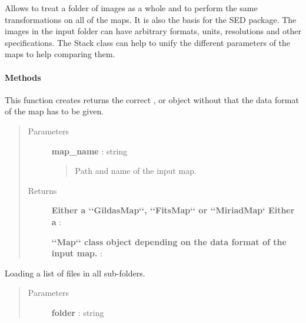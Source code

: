 \documentclass[a4paper,10pt,english]{sphinxmanual}
\begin{document}
\begin{fulllineitems}
\label{maps:astrolyze.maps.stack.Stack}
Allows to treat a folder of images as a whole and to perform the same
transformations on all of the maps. It is also the basis for the SED
package. The images in the input folder can have arbitrary formats, units,
resolutions and other specifications.
The Stack class can help to unify the different parameters of the maps to
help comparing them.
\paragraph{Methods}

\begin{fulllineitems}
\label{maps:astrolyze.maps.stack.Stack.get_map_format}
This function creates returns the correct ,
 or  object without that the data format of the
map has to be given.
\begin{quote}\begin{description}
\item[{Parameters }] \leavevmode
\textbf{map\_name} : string
\begin{quote}

Path and name of the input map.
\end{quote}

\item[{Returns }] \leavevmode
\textbf{Either a {}`{}`GildasMap{}`{}`, {}`{}`FitsMap{}`{}` or {}`{}`MiriadMap{}` Either a} :

\textbf{{}`{}`Map{}`{}` class object depending on the data format of the input map.} :

\end{description}\end{quote}

\end{fulllineitems}


\begin{fulllineitems}
\label{maps:astrolyze.maps.stack.Stack.get_list}
Loading a list of files in all sub-folders.
\begin{quote}\begin{description}
\item[{Parameters }] \leavevmode
\textbf{folder} : string
\begin{quote}


\end{quote}
\end{description}
\end{quote}
\end{fulllineitems}
\end{fulllineitems}
\end{document}
